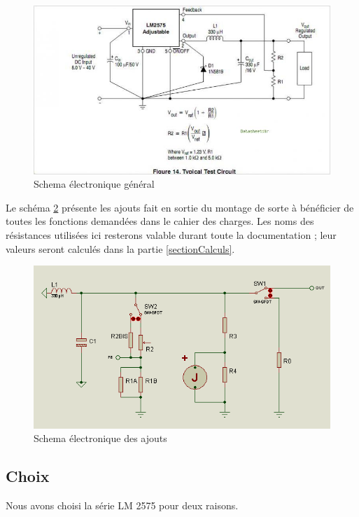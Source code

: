 \documentclass[12pt]{article}
\begin{document}
\begin{figure}[!h]
        \centering
        \includegraphics[scale=0.5]{Schema}
        \caption{Schema électronique général}\label{Schema}
\end{figure}


Le schéma \ref{SchemaAjout} présente les ajouts fait en sortie du montage de sorte à bénéficier de toutes les fonctions
demandées dans le cahier des charges. Les noms des résistances utilisées ici resterons valable durant toute
la documentation ; leur valeurs seront calculés dans la partie \ref{sectionCalculs}.

\begin{figure}[!h]
        \centering
        \includegraphics[scale=0.6]{generatrice}
        \caption{Schema électronique des ajouts}\label{SchemaAjout}
\end{figure}


\subsection{Choix}

Nous avons choisi la série LM 2575 pour deux raisons.
\end{document}
